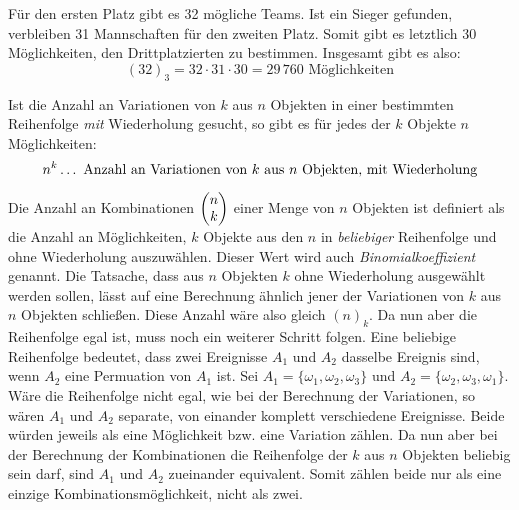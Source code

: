 
F\"{u}r den ersten Platz gibt es 32 m\"{o}gliche Teams. Ist ein Sieger gefunden, verbleiben 31 Mannschaften f\"{u}r den zweiten Platz. Somit gibt es letztlich 30 M\"{o}glichkeiten, den Drittplatzierten zu bestimmen. Insgesamt gibt es also: $$(32)_3 = 32 \cdot 31 \cdot 30 = 29 \, 760 \text{ M\"{o}glichkeiten}$$

Ist die Anzahl an Variationen von $k$ aus $n$ Objekten in einer bestimmten Reihenfolge \emph{mit} Wiederholung gesucht, so gibt es f\"{u}r jedes der $k$ Objekte $n$ M\"{o}glichkeiten: $$n^k \dots \,\, \text{Anzahl an Variationen von $k$ aus $n$ Objekten, mit Wiederholung}$$


Die Anzahl an Kombinationen $\begin{pmatrix}n \\ k\end{pmatrix}$ einer Menge von $n$ Objekten ist definiert als die Anzahl an M\"{o}glichkeiten, $k$ Objekte aus den $n$ in \emph{beliebiger} Reihenfolge und ohne Wiederholung auszuw\"{a}hlen. Dieser Wert wird auch \emph{Binomialkoeffizient} genannt. Die Tatsache, dass aus $n$ Objekten $k$ ohne Wiederholung ausgew\"{a}hlt werden sollen, l\"{a}sst auf eine Berechnung \"{a}hnlich jener der Variationen von $k$ aus $n$ Objekten schlie\ss{}en. Diese Anzahl w\"{a}re also gleich $(n)_k$. Da nun aber die Reihenfolge egal ist, muss noch ein weiterer Schritt folgen. Eine beliebige Reihenfolge bedeutet, dass zwei Ereignisse $A_1$ und $A_2$ dasselbe Ereignis sind, wenn $A_2$ eine Permuation von $A_1$ ist. Sei $A_1 = \{\omega_1, \omega_2, \omega_3\}$ und $A_2 = \{ \omega_2, \omega_3, \omega_1\}$. W\"{a}re die Reihenfolge nicht egal, wie bei der Berechnung der Variationen, so w\"{a}ren $A_1$ und $A_2$ separate, von einander komplett verschiedene Ereignisse. Beide w\"{u}rden jeweils als eine M\"{o}glichkeit bzw. eine Variation z\"{a}hlen. Da nun aber bei der Berechnung der Kombinationen die Reihenfolge der $k$ aus $n$ Objekten beliebig sein darf, sind $A_1$ und $A_2$ zueinander equivalent. Somit z\"{a}hlen beide nur als eine einzige Kombinationsm\"{o}glichkeit, nicht als zwei.

